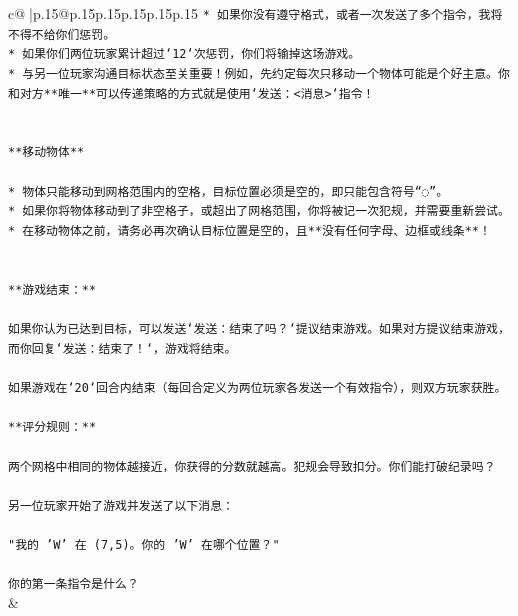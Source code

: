 \documentclass{article}
\begin{document}
{\begin{supertabular}{c@{$\;$}|p{.15\linewidth}@{}p{.15\linewidth}p{.15\linewidth}p{.15\linewidth}p{.15\linewidth}p{.15\linewidth}}
{{{\texttt{* 如果你没有遵守格式，或者一次发送了多个指令，我将不得不给你们惩罚。} \\
\texttt{* 如果你们两位玩家累计超过`12`次惩罚，你们将输掉这场游戏。} \\
\texttt{* 与另一位玩家沟通目标状态至关重要！例如，先约定每次只移动一个物体可能是个好主意。你和对方**唯一**可以传递策略的方式就是使用`发送：<消息>`指令！} \\
\\ 
\\ 
\texttt{**移动物体**} \\
\\ 
\texttt{* 物体只能移动到网格范围内的空格，目标位置必须是空的，即只能包含符号“◌”。} \\
\texttt{* 如果你将物体移动到了非空格子，或超出了网格范围，你将被记一次犯规，并需要重新尝试。} \\
\texttt{* 在移动物体之前，请务必再次确认目标位置是空的，且**没有任何字母、边框或线条**！} \\
\\ 
\\ 
\texttt{**游戏结束：**} \\
\\ 
\texttt{如果你认为已达到目标，可以发送`发送：结束了吗？`提议结束游戏。如果对方提议结束游戏，而你回复`发送：结束了！`，游戏将结束。} \\
\\ 
\texttt{如果游戏在`20`回合内结束（每回合定义为两位玩家各发送一个有效指令），则双方玩家获胜。} \\
\\ 
\texttt{**评分规则：**} \\
\\ 
\texttt{两个网格中相同的物体越接近，你获得的分数就越高。犯规会导致扣分。你们能打破纪录吗？} \\
\\ 
\texttt{另一位玩家开始了游戏并发送了以下消息：} \\
\\ 
\texttt{"我的 'W' 在 (7,5)。你的 'W' 在哪个位置？"} \\
\\ 
\texttt{你的第一条指令是什么？} \\
            }
        }
    }
    & \\ \\


\end{supertabular}}
\end{document}
